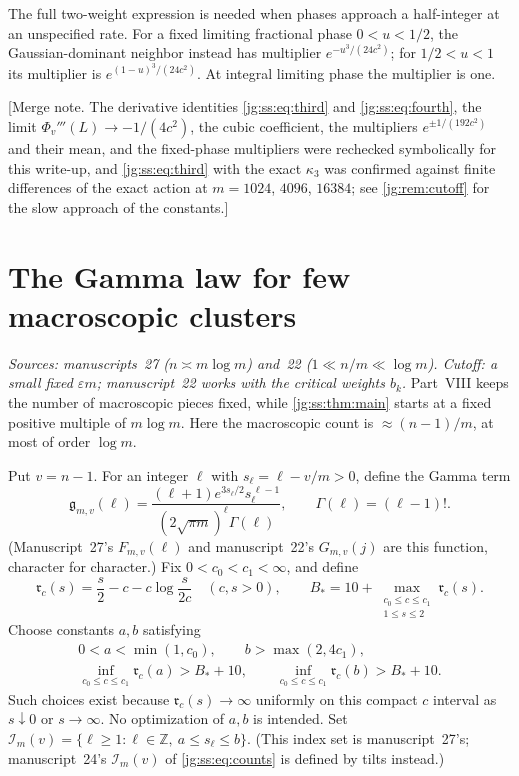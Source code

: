 \documentclass[11pt,a4paper]{article}
\theoremstyle{definition}\newaliascnt{definition}{theorem}
\theoremstyle{remark}\newaliascnt{remark}{theorem}
\begin{document}
The full two-weight expression is needed when phases approach a half-integer at
an unspecified rate. For a fixed limiting fractional phase $0<u<1/2$, the
Gaussian-dominant neighbor instead has multiplier $e^{-u^3/(24c^2)}$; for
$1/2<u<1$ its multiplier is $e^{(1-u)^3/(24c^2)}$. At integral limiting phase
the multiplier is one.

[Merge note. The derivative identities \eqref{jg:ss:eq:third} and
\eqref{jg:ss:eq:fourth}, the limit $\Phi_v'''(L)\to-1/(4c^2)$, the cubic
coefficient, the multipliers $e^{\pm1/(192c^2)}$ and their mean, and the
fixed-phase multipliers were rechecked symbolically for this write-up, and
\eqref{jg:ss:eq:third} with the exact $\kappa_3$ was confirmed against finite
differences of the exact action at $m=1024$, $4096$, $16384$; see
\cref{jg:rem:cutoff} for the slow approach of the constants.]

\section{The Gamma law for few macroscopic clusters}
\label{jg:sec:gamma}
\emph{Sources: manuscripts~27 ($n\asymp m\log m$) and~22
($1\ll n/m\ll\log m$). Cutoff: a small fixed $\varepsilon m$; manuscript~22
works with the critical weights $b_k$.} Part~VIII keeps the number of
macroscopic pieces fixed, while \cref{jg:ss:thm:main} starts at a fixed
positive multiple of $m\log m$. Here the macroscopic count is
$\approx(n-1)/m$, at most of order $\log m$.

Put $v=n-1$. For an integer $\ell$ with $s_\ell=\ell-v/m>0$, define the Gamma
term
\begin{equation}\label{jg:ic:eq:summands}
 \mathfrak g_{m,v}(\ell)
 =\frac{(\ell+1)e^{3s_\ell/2}s_\ell^{\,\ell-1}}
           {(2\sqrt{\pi m})^\ell\Gamma(\ell)},
 \qquad \Gamma(\ell)=(\ell-1)!.
\end{equation}
(Manuscript~27's $F_{m,v}(\ell)$ and manuscript~22's $G_{m,v}(j)$ are this
function, character for character.) Fix $0<c_0<c_1<\infty$, and define
\[
 \mathfrak r_c(s)=\frac s2-c-c\log\frac{s}{2c}\quad(c,s>0),\qquad
 B_*=10+\max_{\substack{c_0\le c\le c_1\\1\le s\le2}}\mathfrak r_c(s).
\]
Choose constants $a,b$ satisfying
\begin{equation}\label{jg:ic:eq:ab}
 \begin{gathered}
 0<a<\min(1,c_0),\qquad b>\max(2,4c_1),\\
 \inf_{c_0\le c\le c_1}\mathfrak r_c(a)>B_*+10,\qquad
 \inf_{c_0\le c\le c_1}\mathfrak r_c(b)>B_*+10.
 \end{gathered}
\end{equation}
Such choices exist because $\mathfrak r_c(s)\to\infty$ uniformly on this compact
$c$ interval as $s\downarrow0$ or $s\to\infty$. No optimization of $a,b$ is
intended. Set $\mathcal I_m(v)=\{\ell\ge1:\ell\in\mathbb Z,\ a\le s_\ell\le b\}$.
(This index set is manuscript~27's; manuscript~24's $\mathcal I_m(v)$ of
\eqref{jg:ss:eq:counts} is defined by tilts instead.)
\end{document}
